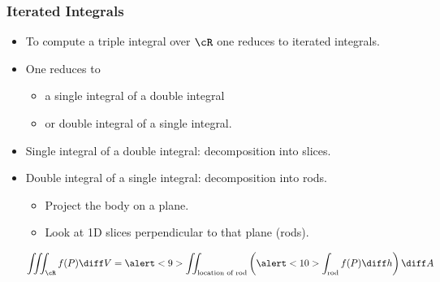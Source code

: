 \begin{frame}
\frametitle{Iterated Integrals}
\begin{itemize}
\item To compute a triple integral over $\cR$ one reduces to iterated integrals.
\item<2-> One reduces to 
\begin{itemize}
\item<2-> a \alert<4>{single integral of a double integral}
\item<3-> or \alert<8>{double integral of a single integral}.
\end{itemize} 
\item<4-> Single integral of a double integral: \alert<4>{decomposition into slices}.
\item<8-> Double integral of a single integral: decomposition into rods.
\begin{itemize}
\item\alert<9>{Project the body on a plane}.
\item\alert<10>{Look at 1D slices perpendicular to that plane (rods)}.
\end{itemize}
\[
\iiint_{\cR}f(P) \diff V = \alert<9>{\iint_{\text{location of rod}}}  \left( \alert<10>{\int_{\text{rod}} f(P)  \diff h} \right)  \diff A
\]
\end{itemize}
\end{frame}